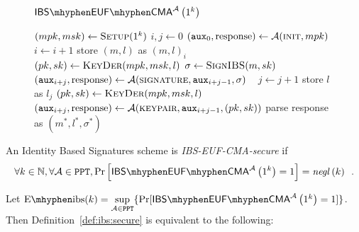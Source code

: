   \begin{figure}[!htbp]
    \begin{gamebox}{$\mathsf{IBS \mhyphen EUF \mhyphen
    CMA}^{\adversary}\left(1^k\right)$}
      \begin{algorithmic}[1]
        \State $(mpk, msk) \gets \textsc{Setup}(1^k)$
        \State $i, j \gets 0$
        \State $(\mathtt{aux}_0, \mathrm{response}) \gets
        \mathcal{A}(\textsc{init}, mpk)$
            \State $i \gets i + 1$
            \State store $(m, l)$ as $(m, l)_i$
            \State $(pk, sk) \gets \textsc{KeyDer}(mpk, msk, l)$
            \State $\sigma \gets \textsc{SignIBS}(m, sk)$
            \State $(\mathtt{aux}_{i+j}, \mathrm{response}) \gets
            \mathcal{A}(\textsc{signature}, \mathtt{aux}_{i+j-1}, \sigma)$
          \Else \ 
            \State $j \gets j + 1$
            \State store $l$ as $l_j$
            \State $(pk, sk) \gets \textsc{KeyDer}(mpk, msk, l)$
            \State $(\mathtt{aux}_{i+j}, \mathrm{response}) \gets
            \mathcal{A}(\textsc{keypair}, \mathtt{aux}_{i+j-1}, (pk, sk))$
          \EndIf
        \EndWhile
        \State parse response as $(m^*, l^*, \sigma^*)$
          \State {}
        \Else
          \State {}
        \EndIf
      \end{algorithmic}
    \end{gamebox}
    \caption{}
    \label{game:ibs}
  \end{figure}
  \begin{definition}
    \label{def:ibs:secure}
    An Identity Based Signatures scheme is \emph{\textsf{IBS-EUF-CMA}-secure}
    if
    \begin{equation*}
      \forall k \in \mathbb{N}, \forall \adversary \in \mathtt{PPT},
      \Pr\left[\mathsf{IBS \mhyphen EUF \mhyphen
      CMA}^{\adversary}\left(1^k\right) = 1\right] =
      \mathit{negl}\left(k\right) \enspace.
    \end{equation*}
  \end{definition}

  Let $\mathrm{E \mhyphen ibs}(k) = \underset{\adversary \in
  \mathtt{PPT}}{\sup}\{\Pr[\mathsf{IBS \mhyphen EUF \mhyphen
  CMA}^{\adversary}\left(1^k\right) = 1]\}$. Then
  Definition~\ref{def:ibs:secure} is equivalent to the following:

